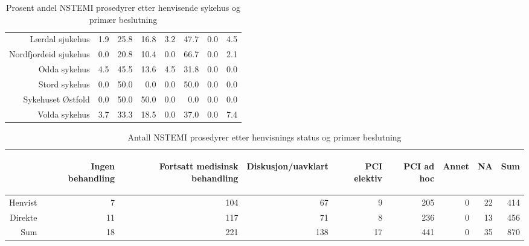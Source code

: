 \documentclass[presentation,xcolor=pdftex,dvipsnames,table]{beamer}
\begin{document}
\begin{frame}
\begin{tiny}
\begin{table}[ht]
\begin{tabular}{rrrrrrrr}
  Lærdal sjukehus & 1.9 & 25.8 & 16.8 & 3.2 & 47.7 & 0.0 & 4.5 \\ 
  Nordfjordeid sjukehus & 0.0 & 20.8 & 10.4 & 0.0 & 66.7 & 0.0 & 2.1 \\ 
  Odda sykehus & 4.5 & 45.5 & 13.6 & 4.5 & 31.8 & 0.0 & 0.0 \\ 
  Stord sykehus & 0.0 & 50.0 & 0.0 & 0.0 & 50.0 & 0.0 & 0.0 \\ 
  Sykehuset Østfold & 0.0 & 50.0 & 50.0 & 0.0 & 0.0 & 0.0 & 0.0 \\ 
  Volda sykehus & 3.7 & 33.3 & 18.5 & 0.0 & 37.0 & 0.0 & 7.4 \\ 
   \bottomrule
\end{tabular}
\caption{Prosent andel NSTEMI prosedyrer etter henvisende sykehus og primær beslutning} 
\end{table}\end{tiny}
\end{frame}


\begin{frame}
\begin{tiny}
\begin{table}[ht]
\centering
\begin{tabular}{rrrrrrrrr}
  \toprule
 & \begin{sideways} Ingen behandling \end{sideways} & \begin{sideways} Fortsatt medisinsk behandling \end{sideways} & \begin{sideways} Diskusjon/uavklart \end{sideways} & \begin{sideways} PCI elektiv \end{sideways} & \begin{sideways} PCI ad hoc \end{sideways} & \begin{sideways} Annet \end{sideways} & \begin{sideways} NA \end{sideways} & \begin{sideways} Sum \end{sideways} \\ 
  \midrule
Henvist & 7 & 104 & 67 & 9 & 205 & 0 & 22 & 414 \\ 
  Direkte & 11 & 117 & 71 & 8 & 236 & 0 & 13 & 456 \\ 
  Sum & 18 & 221 & 138 & 17 & 441 & 0 & 35 & 870 \\ 
   \bottomrule
\end{tabular}
\caption{Antall NSTEMI prosedyrer etter henvisnings status og primær beslutning} 
\end{table}\end{tiny}
\end{frame}
\end{document}
